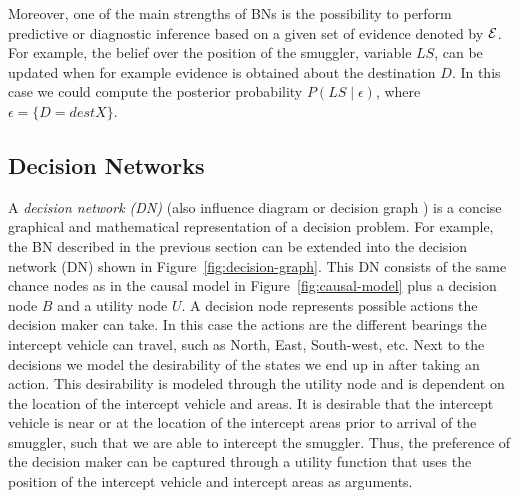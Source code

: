 \documentclass[conference]{IEEEtran}
\begin{document}
  
Moreover, one of the main strengths of BNs is the possibility to perform predictive or diagnostic inference based on a given set of evidence denoted by ${\mathcal{E}}$. For example, the belief over the position of the smuggler, \ie variable $LS$, can be updated when for example evidence is obtained about the destination $D$. In this case we could compute the posterior probability $P(LS\mid \epsilon)$, where $\epsilon = \{D=destX\}$.







\subsection{Decision Networks}\label{sec:decision-networks}

A {\em decision network (DN)} (also influence diagram or decision graph \cite{russell02bn,howard84rpada,jensen07book}) is a concise graphical and mathematical representation of a decision problem. For example, the BN described in the previous section can be extended into the decision network (DN) shown in Figure~\ref{fig:decision-graph}. This DN consists of the same chance nodes as in the causal model in Figure~\ref{fig:causal-model} plus a decision node $B$ and a utility node $U$. A decision node represents possible actions the decision maker can take. In this case the actions are the different bearings the intercept vehicle can travel, such as North, East, South-west, etc. Next to the decisions we model the desirability of the states we end up in after taking an action. This desirability is modeled through the utility node and is dependent on the location of the intercept vehicle and areas. It is desirable that the intercept vehicle is near or at the location of the intercept areas prior to arrival of the smuggler, such that we are able to intercept the smuggler. Thus, the preference of the decision maker can be captured through a utility function that uses the position of the intercept vehicle and intercept areas as arguments.
\end{document}
